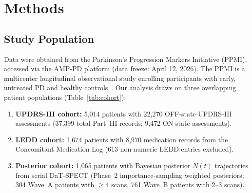\section{Methods}

\subsection{Study Population}

Data were obtained from the Parkinson's Progression Markers Initiative
(PPMI), accessed via the AMP-PD platform (data freeze: April 12, 2026).
The PPMI is a multicenter longitudinal observational study enrolling
participants with early, untreated PD and healthy
controls~\cite{simuni2024}. Our analysis draws on three overlapping
patient populations (Table~\ref{tab:cohort}):

\begin{enumerate}[label=(\roman*)]
  \item \textbf{UPDRS-III cohort:} 5,014 patients with 22,270
    OFF-state UPDRS-III assessments (37,399 total Part~III records;
    9,472 ON-state assessments).
  \item \textbf{LEDD cohort:} 1,674 patients with 8,970 medication
    records from the Concomitant Medication Log (613 non-numeric LEDD
    entries excluded).
  \item \textbf{Posterior cohort:} 1,065 patients with Bayesian
    posterior $N(t)$ trajectories from serial DaT-SPECT (Phase~2
    importance-sampling weighted posteriors; 304 Wave~A patients with
    $\geq$4 scans, 761 Wave~B patients with 2--3 scans).
\end{enumerate}


